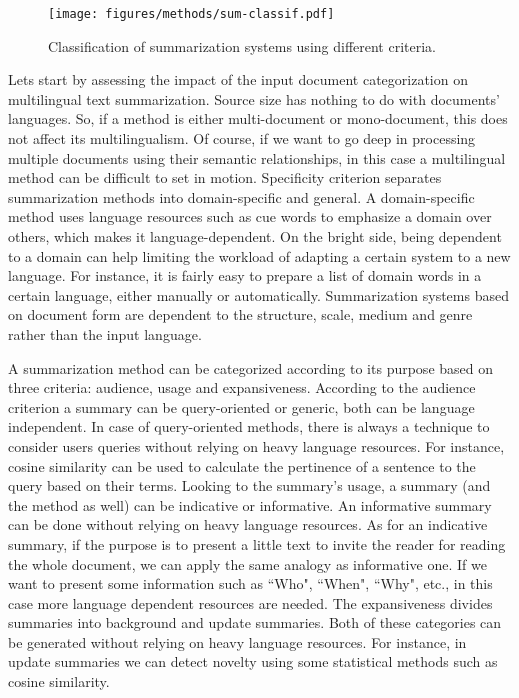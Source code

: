 \documentclass[12pt, oneside, a4paper]{article}
\begin{document}
\begin{figure}[ht]
	\begin{center}
		\texttt{[image: figures/methods/sum-classif.pdf]} %
		\caption{Classification of summarization systems using different criteria.}
		\label{fig:summary-classif}
	\end{center}
\end{figure}

Lets start by assessing the impact of the input document categorization on multilingual text summarization. 
Source size has nothing to do with documents' languages. 
So, if a method is either multi-document or mono-document, this does not affect its multilingualism. 
Of course, if we want to go deep in processing multiple documents using their semantic relationships, in this case a multilingual method can be difficult to set in motion. 
Specificity criterion separates summarization methods into domain-specific and general. 
A domain-specific method uses language resources such as cue words to emphasize a domain over others, which makes it language-dependent. 
On the bright side, being dependent to a domain can help limiting the workload of adapting a certain system to a new language. 
For instance, it is fairly easy to prepare a list of domain words in a certain language, either manually or automatically. 
Summarization systems based on document form are dependent to the structure, scale, medium and genre rather than the input language. 

A summarization method can be categorized according to its purpose based on three criteria: audience, usage and expansiveness.
According to the audience criterion a summary can be query-oriented or generic, both can be language independent.
In case of query-oriented methods, there is always a technique to consider users queries without relying on heavy language resources. 
For instance, cosine similarity can be used to calculate the pertinence of a sentence to the query based on their terms. 
Looking to the summary's usage, a summary (and the method as well) can be indicative or informative.
An informative summary can be done without relying on heavy language resources. 
As for an indicative summary, if the purpose is to present a little text to invite the reader for reading the whole document, we can apply the  same analogy as informative one. 
If we want to present some information such as ``Who", ``When", ``Why", etc., in this case more language dependent resources are needed.
The expansiveness divides summaries into background and update summaries. 
Both of these categories can be generated without relying on heavy language resources.
For instance, in update summaries we can detect novelty using some statistical methods such as cosine similarity.
\end{document}

